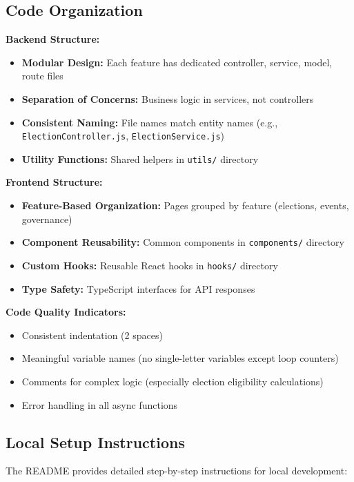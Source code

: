 \documentclass[12pt,a4paper]{article}
\begin{document}
\subsection{Code Organization}

\textbf{Backend Structure:}
\begin{itemize}[noitemsep]
  \item \textbf{Modular Design:} Each feature has dedicated controller, service, model, route files
  \item \textbf{Separation of Concerns:} Business logic in services, not controllers
  \item \textbf{Consistent Naming:} File names match entity names (e.g., \texttt{ElectionController.js}, \texttt{ElectionService.js})
  \item \textbf{Utility Functions:} Shared helpers in \texttt{utils/} directory
\end{itemize}

\textbf{Frontend Structure:}
\begin{itemize}[noitemsep]
  \item \textbf{Feature-Based Organization:} Pages grouped by feature (elections, events, governance)
  \item \textbf{Component Reusability:} Common components in \texttt{components/} directory
  \item \textbf{Custom Hooks:} Reusable React hooks in \texttt{hooks/} directory
  \item \textbf{Type Safety:} TypeScript interfaces for API responses
\end{itemize}

\textbf{Code Quality Indicators:}
\begin{itemize}[noitemsep]
  \item Consistent indentation (2 spaces)
  \item Meaningful variable names (no single-letter variables except loop counters)
  \item Comments for complex logic (especially election eligibility calculations)
  \item Error handling in all async functions
\end{itemize}

\subsection{Local Setup Instructions}

The README provides detailed step-by-step instructions for local development:
\end{document}
